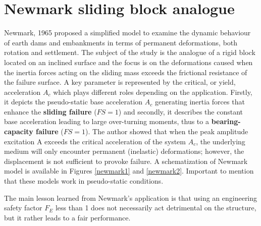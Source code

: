 \documentclass[12pt,a4paper]{report}
\begin{document}
\section{Newmark sliding block analogue}
Newmark, 1965 \cite{veletsos1965deformation} proposed a simplified model to examine the dynamic behaviour of earth dams and embankments in terms of permanent deformations, both rotation and settlement. The subject of the study is the analogue of a rigid block located on an inclined surface and the focus is on the deformations caused when the inertia forces acting on the sliding mass exceeds the frictional resistance of the failure surface. A key parameter is represented by the critical, or yield, acceleration $A_c$ which plays different roles depending on the application. Firstly, it depicts the pseudo-static base acceleration $A_c$ generating inertia forces that enhance the \textbf{sliding failure} ($FS=1$) and secondly, it describes the constant base acceleration leading to large over-turning moments, thus to a \textbf{bearing-capacity failure} ($FS=1$). The author showed that when the peak amplitude excitation A exceeds the critical acceleration of the system $A_c$, the underlying medium will only encounter permanent (inelastic) deformations; however, the displacement is not sufficient to provoke failure. A schematization of Newmark model is available in Figures \ref{newmark1} and \ref{newmark2}. Important to mention that these models work in pseudo-static conditions. 

The main lesson learned from Newmark's application is that using an engineering safety factor $F_E$ less than 1 does not necessarily act detrimental on the structure, but it rather leads to a fair performance.
 
\end{document}

